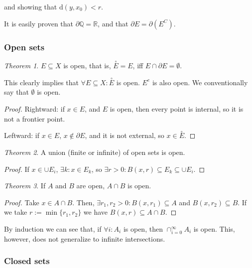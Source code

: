 \documentclass[12pt,a4paper]{report}
\numberwithin{equation}{section}
\theoremstyle{definition}
\theoremstyle{remark}
\newtheorem{theorem}{Theorem}[section]
\begin{document}
and showing that $\text{d}(y, x_0)<r$. 

It is easily proven that $\partial \mathbb{Q} = \mathbb{R}$, and that $\partial E = \partial(E^C)$.

\subsubsection{Open sets}

\begin{theorem}
$E\subseteq X$ is open, that is, $\overset{\circ}{E} =E$, iff $E \cap \partial E = \emptyset$.
\end{theorem}

This clearly implies that $\forall E \subseteq X : \overset{\circ}{E}$ is open. $E^e$ is also open. We conventionally say that $\emptyset$ is open.

\begin{proof}
Rightward: if $x \in E$, and $E$ is open, then every point is internal, so it is not a frontier point.

Leftward: if $x \in E$, $x \notin \partial E$, and it is not external, so $x \in \overset{\circ}{E}$.
\end{proof}

\begin{theorem}
A union (finite or infinite) of open sets is open.
\end{theorem}

\begin{proof}
If $x \in \cup E_i$, $\exists k: x \in E_k$, so $\exists r>0: B(x, r) \subseteq E_k \subseteq \cup E_i$.
\end{proof}

\begin{theorem}
If $A$ and $B$ are open, $A \cap B$ is open.
\end{theorem}

\begin{proof}
Take $x \in A \cap B$. Then, $\exists r_1, r_2 > 0: B(x, r_1) \subseteq A$ and $B(x, r_2) \subseteq B$. If we take $r := \min\lbrace r_1, r_2\rbrace$ we have $B(x, r) \subseteq A \cap B$.
\end{proof}

By induction we can see that, if $\forall i: A_i$ is open, then $\cap_{i=0}^\infty A_i$ is open. This, however, does not generalize to infinite intersections.

\subsubsection{Closed sets}
\end{document}
